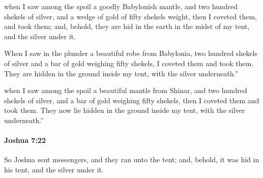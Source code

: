 			\begin{versebox}
					\item[BHS] 
					\item[ASV] when I saw among the spoil a goodly Babylonish mantle, and two hundred shekels of silver, and a wedge of gold of fifty shekels weight, then I coveted them, and took them; and, behold, they are hid in the earth in the midst of my tent, and the silver under it.
					\item[NIV] When I saw in the plunder a beautiful robe from Babylonia, two hundred shekels of silver and a bar of gold weighing fifty shekels, I coveted them and took them. They are hidden in the ground inside my tent, with the silver underneath.”
					\item[NRSV] when I saw among the spoil a beautiful mantle from Shinar, and two hundred shekels of silver, and a bar of gold weighing fifty shekels, then I coveted them and took them. They now lie hidden in the ground inside my tent, with the silver underneath.”
			\end{versebox}

		\paragraph{Joshua 7:22} %
			\label{JOSHUA-7-22}

			So Joshua sent messengers, and they ran unto the tent; and, behold, it was hid in his tent, and the silver under it.

